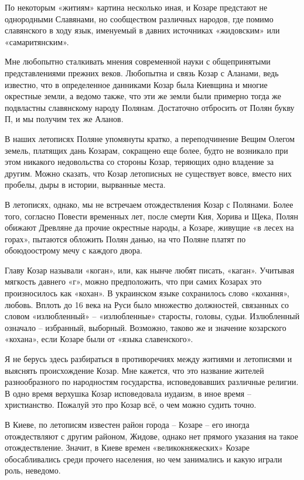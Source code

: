 По некоторым «житиям» картина несколько иная, и Козаре предстают не однородными Славянами, но сообществом различных народов, где помимо славянского в ходу язык, именуемый в давних источниках «жидовским»  или «самаритянским».

Мне любопытно сталкивать мнения современной науки с общепринятыми представлениями прежних веков. Любопытна и связь Козар с Аланами, ведь известно, что в определенное данниками Козар была Киевщина и многие окрестные земли, а ведомо также, что эти же земли были примерно тогда же подвластны славянскому народу Полянам. Достаточно отбросить от Полян букву П, и мы получим тех же Аланов.

В наших летописях Поляне упомянуты кратко, а переподчинение Вещим Олегом земель, платящих дань Козарам, сокращено еще более, будто не возникало при этом никакого недовольства со стороны Козар, теряющих одно владение за другим. Можно сказать, что Козар летописных не существует вовсе, вместо них пробелы, дыры в истории, вырванные места.

В летописях, однако, мы не встречаем отождествления Козар с Полянами. Более того, согласно Повести временных лет, после смерти Кия, Хорива и Щека, Полян обижают Древляне да прочие окрестные народы, а Козаре, живущие «в лесех на горах», пытаются обложить Полян данью, на что Поляне платят по обоюдоострому мечу с каждого двора.

Главу Козар называли «коган», или, как нынче любят писать, «каган». Учитывая мягкость давнего «г», можно предположить, что при самих Козарах это произносилось как «кохан». В украинском языке сохранилось слово «кохання», любовь. Вплоть до 16 века на Руси было множество должностей, связанных со словом «излюбленный» – «излюбленные» старосты, головы, судьи. Излюбленный означало – избранный, выборный. Возможно, таково же и значение козарского «кохана», если Козаре были от «языка славенского».

Я не берусь здесь разбираться в противоречиях между житиями и летописями и выяснять происхождение Козар. Мне кажется, что это название жителей разнообразного по народностям государства, исповедовавших различные религии. В одно время верхушка Козар исповедовала иудаизм, в иное время – христианство. Пожалуй это про Козар всё, о чем можно судить точно.

В Киеве, по летописям известен район города – Козаре – его иногда отождествляют с другим районом, Жидове, однако нет прямого указания на такое отождествление. Значит, в Киеве времен «великокняжеских» Козаре обосабливались среди прочего населения, но чем занимались и какую играли роль, неведомо.

